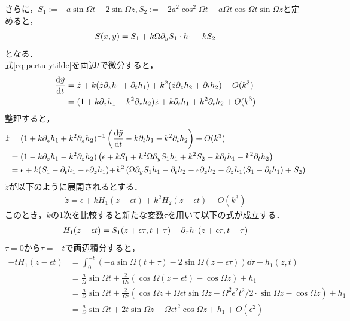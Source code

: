 \documentclass[../main]{subfiles}
\begin{document}
    さらに，$S_1:=-a\sin\Omega t-2\sin\Omega z,S_2:=-2a^2\cos^2\Omega t-a\Omega t\cos \Omega t\sin \Omega z$と定めると，
    \begin{align*}
        S(x,y)=S_1+k\Omega\partial_y S_1\cdot h_1+kS_2
    \end{align*}
    となる．\\
    式\eqref{eq:pertu-ytilde}を両辺$t$で微分すると，
    \begin{align*}
        \dv{\tilde{y}}{t}&=\dot{z}+k(\dot{z}\partial_zh_1+\partial_th_1)+k^2(\dot{z}\partial_zh_2+\partial_th_2)+O(k^3)\\
        &=(1+k\partial_zh_1+k^2\partial_zh_2)\dot{z}+k\partial_th_1+k^2\partial_th_2+O(k^3)\\
    \end{align*}
    整理すると，
    \begin{align*}
        \dot{z}&=(1+k\partial_zh_1+k^2\partial_zh_2)^{-1}\left( \dv{\tilde{y}}{t}-k\partial_th_1-k^2\partial_th_2 \right)+O(k^3)\\
        &=(1-k\partial_zh_1-k^2\partial_zh_2)\left(\epsilon+kS_1+k^2\Omega \partial_y S_1h_1+k^2S_2-k\partial_th_1-k^2\partial_th_2 \right)\\
        &=\epsilon+k(S_1-\partial_th_1-\epsilon\partial_zh_1)\!+\!k^2\left(\Omega \partial_y S_1h_1 -\partial_th_2-\epsilon\partial_zh_2 -\partial_zh_1(S_1-\partial_th_1)+S_2\right)\\
    \end{align*}
    $\dot{z}$が以下のように展開されるとする．
    \begin{align*}
        \dot{z}=\epsilon+kH_1(z-\epsilon t)+k^2H_2(z-\epsilon t)+O(k^3)
    \end{align*}
    このとき，$k$の1次を比較すると新たな変数$\tau$を用いて以下の式が成立する．
    \begin{align*}
        H_1(z-\epsilon t)=S_1(z+\epsilon\tau,t+\tau)-\partial_\tau h_1(z+\epsilon\tau,t+\tau)
    \end{align*}
    $\tau=0$から$\tau=-t$で両辺積分すると，
    \begin{align}
        -tH_1(z-\epsilon t)&=\int_0^{-t}\left(-a\sin\Omega(t+\tau)-2\sin\Omega(z+\epsilon\tau)\right)\dd{\tau}+h_1(z,t)\\
        &=\frac{a}{\Omega}\sin\Omega t+\frac{2}{\Omega \epsilon}(\cos \Omega (z-\epsilon t)-\cos \Omega z)+h_1\\
        &=\frac{a}{\Omega}\sin\Omega t+\frac{2}{\Omega \epsilon}(\cos \Omega z+\Omega \epsilon t\sin \Omega z-\Omega^2\epsilon^2t^2/2\cdot\sin \Omega z-\cos \Omega z)+h_1\\
        &=\frac{a}{\Omega}\sin\Omega t+2t\sin \Omega z-\Omega\epsilon t^2\cos \Omega z+h_1+O(\epsilon^2)
        \label{eq-h1-H1}
    \end{align}
\end{document}
